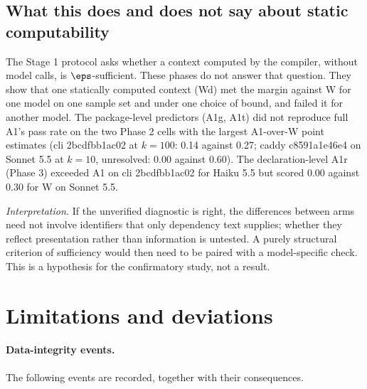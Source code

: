\subsection{What this does and does not say about static computability}

The Stage 1 protocol asks whether a context computed by the compiler, without model calls, is $\eps$-sufficient. These phases do not answer that question. They show that one statically computed context (Wd) met the margin against W for one model on one sample set and under one choice of bound, and failed it for another model. The package-level predictors (A1g, A1t) did not reproduce full A1's pass rate on the two Phase 2 cells with the largest A1-over-W point estimates (cli 2bcdfbb1ac02 at $k=100$: 0.14 against 0.27; caddy c8591a1e46e4 on Sonnet 5.5 at $k=10$, unresolved: 0.00 against 0.60). The declaration-level A1r (Phase 3) exceeded A1 on cli 2bcdfbb1ac02 for Haiku 5.5 but scored 0.00 against 0.30 for W on Sonnet 5.5.

\emph{Interpretation.} If the unverified diagnostic is right, the differences between arms need not involve identifiers that only dependency text supplies; whether they reflect presentation rather than information is untested. A purely structural criterion of sufficiency would then need to be paired with a model-specific check. This is a hypothesis for the confirmatory study, not a result.

\section{Limitations and deviations}\label{sec:lim}

\paragraph{Data-integrity events.} The following events are recorded, together with their consequences.

